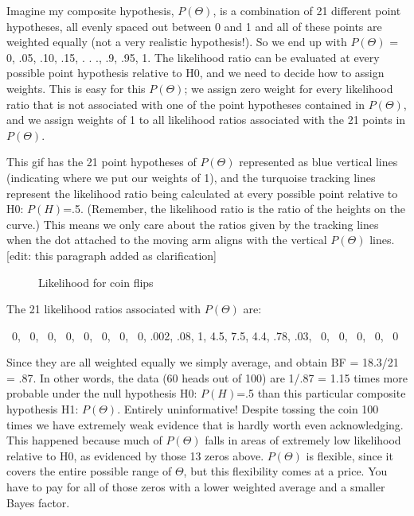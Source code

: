 Imagine my composite hypothesis, $P(\Theta)$, is a combination of 21 different point hypotheses, all evenly spaced out between 0 and 1 and all of these points are weighted equally (not a very realistic hypothesis!). So we end up with $P(\Theta)$ = {0, .05, .10, .15, . . ., .9, .95, 1}. The likelihood ratio can be evaluated at every possible point hypothesis relative to H0, and we need to decide how to assign weights. This is easy for this $P(\Theta)$; we assign zero weight for every likelihood ratio that is not associated with one of the point hypotheses contained in $P(\Theta)$, and we assign weights of 1 to all likelihood ratios associated with the 21 points in $P(\Theta)$.

This gif has the 21 point hypotheses of $P(\Theta)$ represented as blue vertical lines (indicating where we put our weights of 1), and the turquoise tracking lines represent the likelihood ratio being calculated at every possible point relative to H0: $P(H)$=.5. (Remember, the likelihood ratio is the ratio of the heights on the curve.) This means we only care about the ratios given by the tracking lines when the dot attached to the moving arm aligns with the vertical $P(\Theta)$ lines. [edit: this paragraph added as clarification]

\begin{figure}[h]
    \centering
    \caption{Likelihood for coin flips}
    \label{fig:p05c03-snip14}
\end{figure}
The 21 likelihood ratios associated with $P(\Theta)$ are:

{~0, ~0, ~0, ~0, ~0, ~0, ~0, ~0, .002, .08, 1, 4.5, 7.5, 4.4, .78, .03, ~0, ~0, ~0, ~0, ~0}

Since they are all weighted equally we simply average, and obtain BF = 18.3/21 = .87. In other words, the data (60 heads out of 100) are 1/.87 = 1.15 times more probable under the null hypothesis   H0: $P(H)$=.5   than this particular composite hypothesis H1: $P(\Theta)$. Entirely uninformative! Despite tossing the coin 100 times we have extremely weak evidence that is hardly worth even acknowledging. This happened because much of $P(\Theta)$ falls in areas of extremely low likelihood relative to H0, as evidenced by those 13 zeros above. $P(\Theta)$ is flexible, since it covers the entire possible range of $\Theta$, but this flexibility comes at a price. You have to pay for all of those zeros with a lower weighted average and a smaller Bayes factor.

